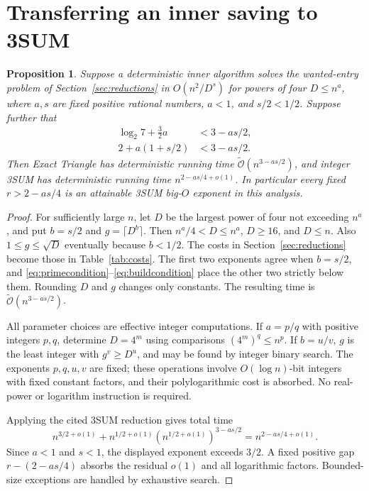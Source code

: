 \documentclass[11pt,a4paper]{article}
\newtheorem{proposition}[theorem]{Proposition}
\theoremstyle{remark}
\newcommand{\Ot}{\widetilde{\mathcal{O}}}
\begin{document}
\section{Transferring an inner saving to 3SUM}\label{sec:transfer}

\begin{proposition}\label{prop:transfer}
Suppose a deterministic inner algorithm solves the wanted-entry problem of
Section~\ref{sec:reductions} in $O(n^2/D^s)$ for powers of four
$D\leq n^a$, where $a,s$ are fixed positive rational numbers, $a<1$, and
$s/2<1/2$. Suppose further that
\begin{align}
 \log_2 7+\tfrac32a&<3-as/2,\label{eq:primecondition}\\
 2+a(1+s/2)&<3-as/2.\label{eq:buildcondition}
\end{align}
Then Exact Triangle has deterministic running time
$\Ot(n^{3-as/2})$, and integer 3SUM has deterministic running time
$n^{2-as/4+o(1)}$. In particular every fixed $r>2-as/4$ is an attainable
3SUM big-$O$ exponent in this analysis.
\end{proposition}
\begin{proof}
For sufficiently large $n$, let $D$ be the largest power of four not exceeding
$n^a$, and put $b=s/2$ and $g=\lceil D^b\rceil$. Then
$n^a/4<D\leq n^a$, $D\geq16$, and $D\leq n$. Also $1\leq g\leq\sqrt D$
eventually because $b<1/2$.
The costs in Section~\ref{sec:reductions} become those in
Table~\ref{tab:costs}. The first two exponents agree when $b=s/2$, and
\eqref{eq:primecondition}--\eqref{eq:buildcondition} place the other two
strictly below them. Rounding $D$ and $g$ changes only constants. The
resulting time is $\Ot(n^{3-as/2})$.

All parameter choices are effective integer computations. If $a=p/q$ with
positive integers $p,q$, determine $D=4^m$ using comparisons
$(4^m)^q\leq n^p$. If $b=u/v$, $g$ is the least integer with
$g^v\geq D^u$, and may be found by integer binary search. The exponents
$p,q,u,v$ are fixed; these operations involve $O(\log n)$-bit integers
with fixed constant factors, and their polylogarithmic cost is absorbed.
No real-power or logarithm instruction is required.

Applying the cited 3SUM reduction gives total time
\[
 n^{3/2+o(1)}+
 n^{1/2+o(1)}(n^{1/2+o(1)})^{3-as/2}
 =n^{2-as/4+o(1)}.
\]
Since $a<1$ and $s<1$, the displayed exponent exceeds $3/2$. A fixed
positive gap $r-(2-as/4)$ absorbs the residual $o(1)$ and all logarithmic
factors. Bounded-size exceptions are handled by exhaustive search.
\end{proof}
\end{document}
